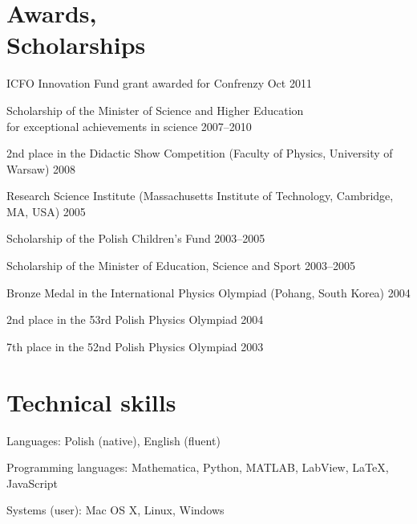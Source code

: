 \documentclass[margin,line]{resume}
\begin{document}
\begin{resume}
    \section{\mysidestyle Awards,\\Scholarships}
    \begin{list2}
    	\item ICFO Innovation Fund grant awarded for Confrenzy \hfill Oct 2011
        \item Scholarship of the Minister of Science and Higher Education\\for exceptional achievements in science \hfill 2007--2010
        \item 2nd  place in the Didactic Show Competition (Faculty of Physics, University of Warsaw)  \hfill 2008  %
        \item Research Science Institute (Massachusetts Institute of Technology, Cambridge, MA, USA) \hfill 2005
        \item Scholarship of the Polish Children's Fund \hfill 2003--2005
        \item Scholarship of the Minister of Education, Science and Sport \hfill 2003--2005
        \item Bronze Medal in the International Physics Olympiad (Pohang, South Korea) \hfill 2004
        \item 2nd  place in the 53rd Polish Physics Olympiad \hfill 2004
        \item 7th  place in the 52nd Polish Physics Olympiad \hfill 2003
    \end{list2}

\vspace{3mm}

    \section{\mysidestyle Technical skills}
    \begin{list2}
        \item Languages: Polish (native), English (fluent)
        \item Programming languages: Mathematica, Python, MATLAB, LabView, LaTeX, JavaScript
        \item Systems (user): Mac OS X, Linux, Windows
    \end{list2}

\newpage


\end{resume}
\end{document}
